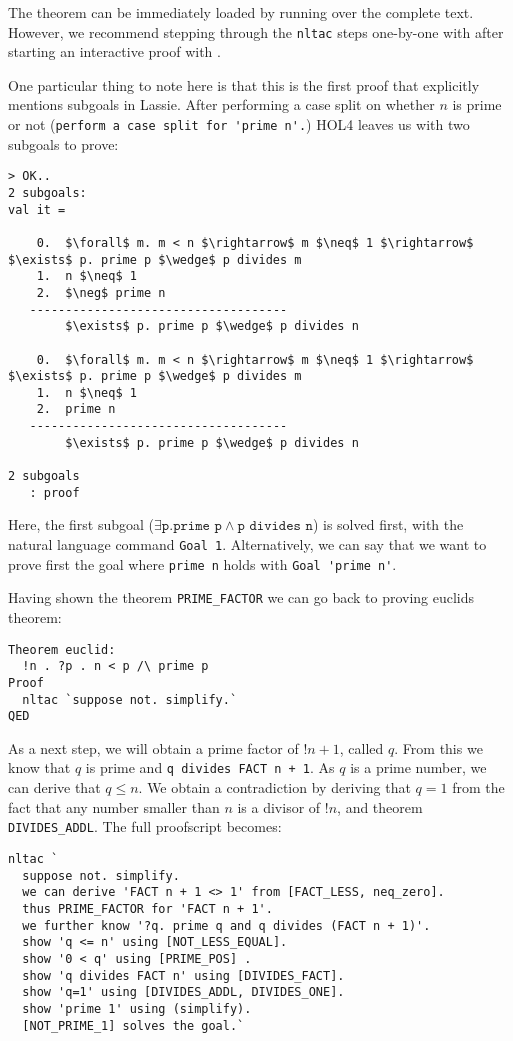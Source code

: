 The theorem can be immediately loaded by running  over the complete
text.
However, we recommend stepping through the \lstinline{nltac} steps one-by-one
with  after starting an interactive proof with .

One particular thing to note here is that this is the first proof that
explicitly mentions subgoals in Lassie.
After performing a case split on whether $n$ is prime or not
(\lstinline{perform a case split for 'prime n'.}) HOL4 leaves us with two
subgoals to prove:

\begin{lstlisting}[frame=single]
> OK..
2 subgoals:
val it =

    0.  $\forall$ m. m < n $\rightarrow$ m $\neq$ 1 $\rightarrow$ $\exists$ p. prime p $\wedge$ p divides m
    1.  n $\neq$ 1
    2.  $\neg$ prime n
   ------------------------------------
        $\exists$ p. prime p $\wedge$ p divides n

    0.  $\forall$ m. m < n $\rightarrow$ m $\neq$ 1 $\rightarrow$ $\exists$ p. prime p $\wedge$ p divides m
    1.  n $\neq$ 1
    2.  prime n
   ------------------------------------
        $\exists$ p. prime p $\wedge$ p divides n

2 subgoals
   : proof
\end{lstlisting}

Here, the first subgoal ($\exists \texttt{p}. \texttt{prime p} \wedge \texttt{p divides n}$)
is solved first, with the natural language command \lstinline{Goal 1}.
Alternatively, we can say that we want to prove first the goal where \texttt{prime n} holds with
\lstinline{Goal 'prime n'}.

Having shown the theorem \lstinline{PRIME_FACTOR} we can go back to proving
euclids theorem:
\begin{lstlisting}
Theorem euclid:
  !n . ?p . n < p /\ prime p
Proof
  nltac `suppose not. simplify.`
QED
\end{lstlisting}

As a next step, we will obtain a prime factor of $!n + 1$, called $q$.
From this we know that $q$ is prime and \lstinline{q divides FACT n + 1}.
As $q$ is a prime number, we can derive that $q \leq n$.
We obtain a contradiction by deriving that $q = 1$ from the fact that any number
smaller than $n$ is a divisor of $!n$, and theorem \lstinline{DIVIDES_ADDL}.
The full proofscript becomes:
\begin{lstlisting}[mathescape=true]
nltac `
  suppose not. simplify.
  we can derive 'FACT n + 1 <> 1' from [FACT_LESS, neq_zero].
  thus PRIME_FACTOR for 'FACT n + 1'.
  we further know '?q. prime q and q divides (FACT n + 1)'.
  show 'q <= n' using [NOT_LESS_EQUAL].
  show '0 < q' using [PRIME_POS] .
  show 'q divides FACT n' using [DIVIDES_FACT].
  show 'q=1' using [DIVIDES_ADDL, DIVIDES_ONE].
  show 'prime 1' using (simplify).
  [NOT_PRIME_1] solves the goal.`
\end{lstlisting}

